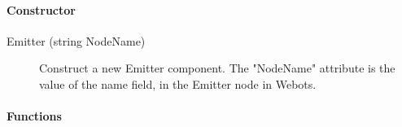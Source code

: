 \paragraph{Constructor}
\label{webots.uobjects.robotdevices.emitter.constructor}%

\noindent
\begin{description}
\item[{Emitter (string NodeName)}] Construct a new Emitter component. The "NodeName" attribute is the value
          of the name field, in the Emitter node in Webots.

\end{description}

\paragraph{Functions}
\label{webots.uobjects.robotdevices.emitter.functions}%

